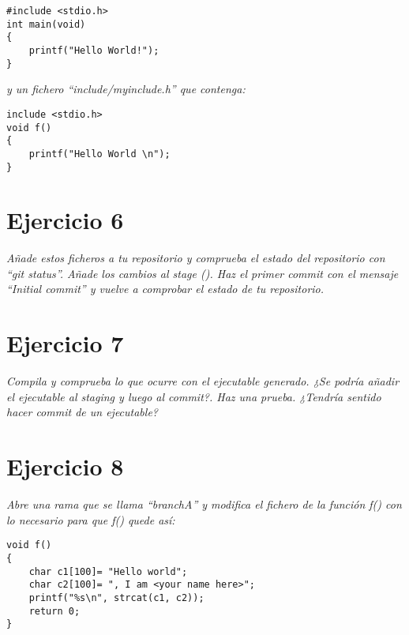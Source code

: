 \begin{lstlisting}[style=CStyle,xleftmargin=.3\textwidth]
#include <stdio.h>
int main(void)
{
    printf("Hello World!"); 
}\end{lstlisting}
    
\begin{center}
    \parbox{12cm}{\justify\textit{
        y un fichero ``include/myinclude.h'' que contenga:
    }}
\end{center}

\begin{lstlisting}[style=CStyle,xleftmargin=.3\textwidth]
include <stdio.h>
void f()
{
    printf("Hello World \n");
}\end{lstlisting}

\section{Ejercicio 6}
\begin{center}
    \parbox{12cm}{\justify\textit{
        Añade estos ficheros a tu repositorio y comprueba el estado del repositorio con “git status”. Añade los cambios al stage (). Haz el primer commit con el mensaje ``Initial commit'' y vuelve a comprobar el estado de tu repositorio.
    }}
\end{center}

\section{Ejercicio 7}
\begin{center}
    \parbox{12cm}{\justify\textit{
        Compila y comprueba lo que ocurre con el ejecutable generado. ¿Se podría añadir el ejecutable al staging y luego al commit?. Haz una prueba. ¿Tendría sentido hacer commit de un ejecutable?
    }}
\end{center}

\section{Ejercicio 8}
\begin{center}
    \parbox{12cm}{\justify\textit{
        Abre una rama que se llama ``branchA'' y modifica el fichero de la función f() con lo necesario para que f() quede así:
    }}
\begin{lstlisting}[style=CStyle,xleftmargin=.3\textwidth]
void f()
{
    char c1[100]= "Hello world";
    char c2[100]= ", I am <your name here>";
    printf("%s\n", strcat(c1, c2));
    return 0;
}\end{lstlisting}
\end{center}

